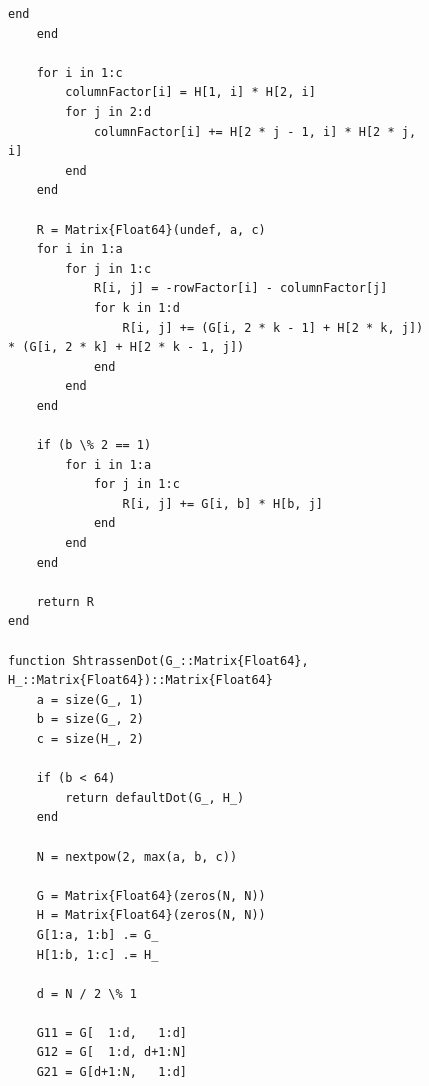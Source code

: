 \documentclass[a4paper, 14pt]{extarticle}
\begin{document}
\begin{figure}[!htb]
\begin{lstlisting}[caption={Реализация и сравнение разных вариаций метода Гаусса},label={lst:code1}]
        end
    end

    for i in 1:c
        columnFactor[i] = H[1, i] * H[2, i]
        for j in 2:d
            columnFactor[i] += H[2 * j - 1, i] * H[2 * j, i]
        end
    end

    R = Matrix{Float64}(undef, a, c)
    for i in 1:a
        for j in 1:c
            R[i, j] = -rowFactor[i] - columnFactor[j]
            for k in 1:d
                R[i, j] += (G[i, 2 * k - 1] + H[2 * k, j]) * (G[i, 2 * k] + H[2 * k - 1, j])
            end
        end
    end

    if (b \% 2 == 1)
        for i in 1:a
            for j in 1:c
                R[i, j] += G[i, b] * H[b, j]
            end
        end
    end

    return R
end

function ShtrassenDot(G_::Matrix{Float64}, H_::Matrix{Float64})::Matrix{Float64}
    a = size(G_, 1)
    b = size(G_, 2)
    c = size(H_, 2)

    if (b < 64)
        return defaultDot(G_, H_)
    end

    N = nextpow(2, max(a, b, c))

    G = Matrix{Float64}(zeros(N, N))
    H = Matrix{Float64}(zeros(N, N))
    G[1:a, 1:b] .= G_
    H[1:b, 1:c] .= H_

    d = N / 2 \% 1

    G11 = G[  1:d,   1:d]
    G12 = G[  1:d, d+1:N]
    G21 = G[d+1:N,   1:d]
\end{lstlisting}
\end{figure}
\end{document}
